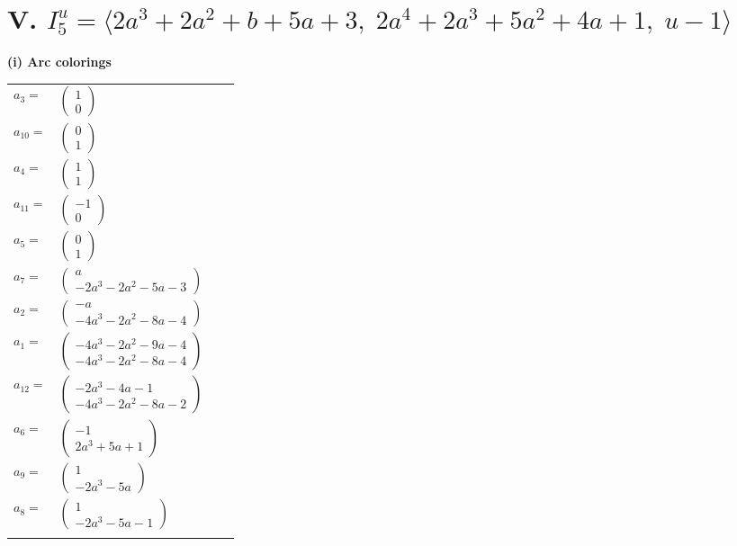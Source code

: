 \documentclass[1p]{elsarticle_modified}
\theoremstyle{definition}
\begin{document}
\centering \section*{V. $I^u_{5}= \langle 2 a^3+2 a^2+b+5 a+3,\;2 a^4+2 a^3+5 a^2+4 a+1,\;u-1 \rangle$}
\flushleft \textbf{(i) Arc colorings}\\
\begin{tabular}{m{7pt} m{180pt} m{7pt} m{180pt} }
\flushright $a_{3}=$&$\begin{pmatrix}1\\0\end{pmatrix}$ \\
\flushright $a_{10}=$&$\begin{pmatrix}0\\1\end{pmatrix}$ \\
\flushright $a_{4}=$&$\begin{pmatrix}1\\1\end{pmatrix}$ \\
\flushright $a_{11}=$&$\begin{pmatrix}-1\\0\end{pmatrix}$ \\
\flushright $a_{5}=$&$\begin{pmatrix}0\\1\end{pmatrix}$ \\
\flushright $a_{7}=$&$\begin{pmatrix}a\\-2 a^3-2 a^2-5 a-3\end{pmatrix}$ \\
\flushright $a_{2}=$&$\begin{pmatrix}- a\\-4 a^3-2 a^2-8 a-4\end{pmatrix}$ \\
\flushright $a_{1}=$&$\begin{pmatrix}-4 a^3-2 a^2-9 a-4\\-4 a^3-2 a^2-8 a-4\end{pmatrix}$ \\
\flushright $a_{12}=$&$\begin{pmatrix}-2 a^3-4 a-1\\-4 a^3-2 a^2-8 a-2\end{pmatrix}$ \\
\flushright $a_{6}=$&$\begin{pmatrix}-1\\2 a^3+5 a+1\end{pmatrix}$ \\
\flushright $a_{9}=$&$\begin{pmatrix}1\\-2 a^3-5 a\end{pmatrix}$ \\
\flushright $a_{8}=$&$\begin{pmatrix}1\\-2 a^3-5 a-1\end{pmatrix}$\\&\end{tabular}
\end{document}
